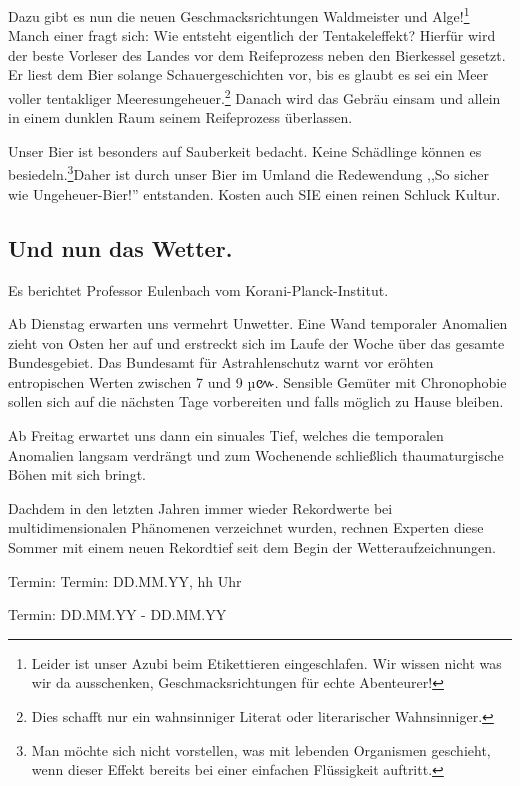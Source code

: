 \documentclass[final]{multiversum}
\begin{document}
Dazu gibt es nun die neuen Geschmacksrichtungen Waldmeister und Alge!\footnote{Leider ist unser Azubi beim Etikettieren eingeschlafen. Wir wissen nicht was wir da ausschenken, Geschmacksrichtungen für echte Abenteurer!}
Manch einer fragt sich: Wie entsteht eigentlich der Tentakeleffekt?
Hierfür wird der beste Vorleser des Landes vor dem Reifeprozess neben den Bierkessel gesetzt.
Er liest dem Bier solange Schauergeschichten vor, bis es glaubt es sei ein Meer voller tentakliger Meeresungeheuer.\footnote{Dies schafft nur ein wahnsinniger Literat oder literarischer Wahnsinniger.}
Danach wird das Gebräu einsam und allein in einem dunklen Raum seinem Reifeprozess überlassen.

Unser Bier ist besonders auf Sauberkeit bedacht. Keine Schädlinge können es besiedeln.\footnote{Man möchte sich nicht vorstellen, was mit lebenden Organismen geschieht, wenn dieser Effekt bereits bei einer einfachen Flüssigkeit auftritt.}Daher ist durch unser Bier im Umland die Redewendung ,,So sicher wie Ungeheuer-Bier!'' entstanden. Kosten auch SIE einen reinen Schluck Kultur.

\subsection{Und nun das Wetter.} 
Es berichtet Professor Eulenbach vom Korani-Planck-Institut.

Ab Dienstag erwarten uns vermehrt Unwetter. Eine Wand temporaler Anomalien zieht von Osten her auf und erstreckt sich im Laufe der Woche über das gesamte Bundesgebiet. Das Bundesamt für Astrahlenschutz warnt vor eröhten entropischen Werten zwischen 7 und 9 µ{\khmerfont៚}. Sensible Gemüter mit Chronophobie sollen sich auf die nächsten Tage vorbereiten und falls möglich zu Hause bleiben.

Ab Freitag erwartet uns dann ein sinuales Tief, welches die temporalen Anomalien langsam verdrängt und zum Wochenende schließlich thaumaturgische Böhen mit sich bringt. 

Dachdem in den letzten Jahren immer wieder Rekordwerte bei multidimensionalen Phänomenen verzeichnet wurden, rechnen Experten diese Sommer mit einem neuen Rekordtief seit dem Begin der Wetteraufzeichnungen. 

\begin{termine}
\item Termin: Termin: DD.MM.YY, hh Uhr
  \item Termin: DD.MM.YY - DD.MM.YY
\end{termine}
\impressum
\end{document}
